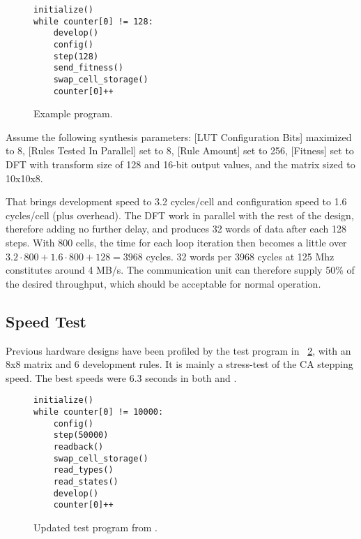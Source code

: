 \begin{figure}[!ht]
\begin{lstlisting}[xleftmargin=0.35\textwidth]
initialize()
while counter[0] != 128:
    develop()
    config()
    step(128)
    send_fitness()
    swap_cell_storage()
    counter[0]++
\end{lstlisting}
\caption[Example program] {
    Example program.
}
\label{fig:example-program}
\end{figure}

Assume the following synthesis parameters:
[LUT Configuration Bits] maximized to 8,
[Rules Tested In Parallel] set to 8,
[Rule Amount] set to 256,
[Fitness] set to DFT with transform size of 128 and 16-bit output values,
and the matrix sized to 10x10x8.

That brings development speed to 3.2 cycles/cell and configuration speed to 1.6 cycles/cell (plus overhead)\footnotemark.
The DFT work in parallel with the rest of the design, therefore adding no further delay, and produces 32 words of data after each 128 steps.
With 800 cells, the time for each loop iteration then becomes a little over $3.2 \cdot 800 + 1.6 \cdot 800 + 128 = 3968$ cycles.
32 words per 3968 cycles at 125 Mhz constitutes around 4 MB/s.
The communication unit can therefore supply 50\% of the desired throughput, which should be acceptable for normal operation.


\subsection{Speed Test}

Previous hardware designs have been profiled by the test program in \figurename~\ref{fig:test-program}, with an 8x8 matrix and 6 development rules.
It is mainly a stress-test of the CA stepping speed.
The best speeds were 6.3 seconds in both \cite{djupdal2003sblock} and \cite{stovneng2014sblock}.

\begin{figure}[!ht]
\begin{lstlisting}[xleftmargin=0.34\textwidth]
initialize()
while counter[0] != 10000:
    config()
    step(50000)
    readback()
    swap_cell_storage()
    read_types()
    read_states()
    develop()
    counter[0]++
\end{lstlisting}
\caption[Test program] {
    Updated test program from \cite{djupdal2003sblock}.
}
\label{fig:test-program}
\end{figure}

